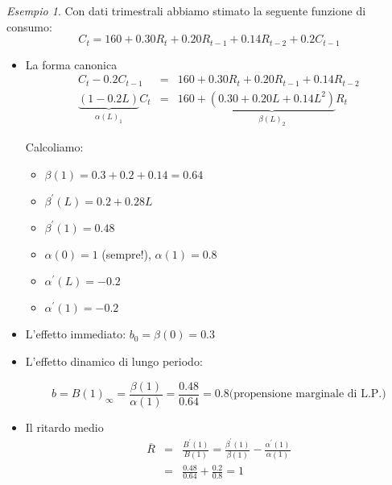 \documentclass[a4paper]{report}
\newcounter{ese}
\theoremstyle{remark}
\newtheorem{esempio}[ese]{Esempio}
\newcounter{theor}
\begin{document}
\begin{esempio}
Con dati trimestrali abbiamo stimato la seguente funzione di consumo:%
\begin{equation*}
C_{t}=160+0.30R_{t}+0.20R_{t-1}+0.14R_{t-2}+0.2C_{t-1}
\end{equation*}
\end{esempio}

\begin{itemize}
\item La forma canonica%
\begin{eqnarray*}
C_{t}-0.2C_{t-1} &=&160+0.30R_{t}+0.20R_{t-1}+0.14R_{t-2} \\
\underset{\alpha (L)_{1}}{\underbrace{\left( 1-0.2L\right) }}C_{t} &=&160+%
\underset{\beta (L)_{2}}{\underbrace{\left( 0.30+0.20L+0.14L^{2}\right) }}%
R_{t}
\end{eqnarray*}

Calcoliamo:

\begin{itemize}
\item $\beta (1)=0.3+0.2+0.14=0.64$

\item $\beta ^{\prime }(L)=0.2+0.28L$

\item $\beta ^{\prime }(1)=0.48$

\item $\alpha (0)=1$ (sempre!), $\alpha (1)=0.8$

\item $\alpha ^{\prime }(L)=-0.2$

\item $\alpha ^{\prime }(1)=-0.2$
\end{itemize}

\item L'effetto immediato: $b_{0}=\beta (0)=0.3$

\item L'effetto dinamico di lungo periodo:

\begin{equation*}
b=B(1)_{\infty }=\frac{\beta (1)}{\alpha (1)}=\frac{0.48}{0.64}=0.8\text{
(propensione marginale di L.P.)}
\end{equation*}

\item Il ritardo medio%
\begin{eqnarray*}
\overline{R} &=&\frac{B^{\prime }(1)}{B(1)}=\frac{\beta ^{\prime }(1)}{\beta
(1)}-\frac{\alpha ^{\prime }(1)}{\alpha (1)} \\
&=&\frac{0.48}{0.64}+\frac{0.2}{0.8}=1
\end{eqnarray*}


\end{itemize}
\end{document}

